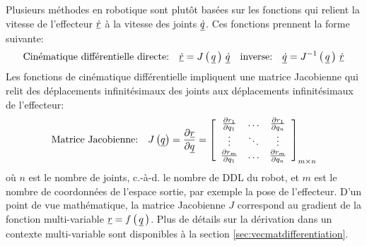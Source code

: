 Plusieurs méthodes en robotique sont plutôt basées sur les fonctions qui relient la vitesse de l'effecteur $\underline{\dot{r}}$ à la vitesse des joints $\underline{\dot{q}}$. Ces fonctions prennent la forme suivante:
\begin{equation}
	\text{Cinématique différentielle directe:} \quad \underline{\dot{r}} = J\left( \, \underline{q} \, \right) \, \underline{\dot{q}}   \quad \text{inverse:} \quad \underline{\dot{q}} = J^{-1}\left( \, \underline{q} \, \right) \, \underline{\dot{r}}
	\label{eq:diffkinrel}
\end{equation}
Les fonctions de cinématique différentielle impliquent une matrice Jacobienne qui relit des déplacements infinitésimaux des joints aux déplacements infinitésimaux de l'effecteur:
\begin{equation}
	\text{Matrice Jacobienne:} \quad J\left( \underline{q} \right) = \frac{\partial \underline{r}}{\partial \underline{q}} =
	\left[ \begin{array}{c c c}
			   \frac{\partial r_1 }{\partial q_1}   &  \hdots & \frac{\partial r_1 }{\partial q_n} \\
			   \vdots                               &  \ddots & \vdots                             \\
			   \frac{\partial r_m }{\partial q_1}   &  \hdots & \frac{\partial r_m }{\partial q_n}
	\end{array} \right]_{m \times n}
	\label{eq:matricejaco}
\end{equation}
où $n$ est le nombre de joints, c.-à-d. le nombre de DDL du robot, et $m$ est le nombre de coordonnées de l'espace sortie, par exemple la pose de l'effecteur.  D'un point de vue mathématique, la matrice Jacobienne $J$ correspond au gradient de la fonction multi-variable $\underline{r} = f\left( \, \underline{q} \, \right)$. Plus de détails sur la dérivation dans un contexte multi-variable sont disponibles à la section \ref{sec:vecmatdifferentiation}.

